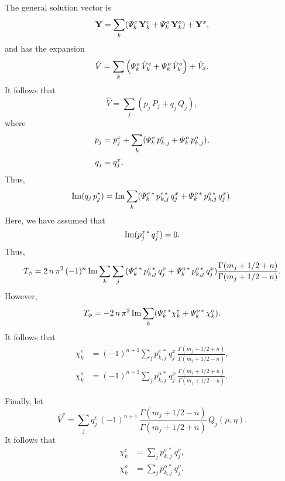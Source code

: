 \documentclass[12pt,prb,aps,notitlepage]{revtex4-1}
\begin{document}
The
general solution vector
is
\begin{equation}
{\bf Y} = \sum_k ({\mit\Psi}_k^e\,{\bf Y}_k^e + {\mit\Psi}_k^o\,{\bf Y}_k^o) + {\bf Y}^x,
\end{equation}
and has the expansion
\begin{equation}
\hat{V} = \sum_k\left({\mit\Psi}_k^e\,\hat{V}_k^e + {\mit\Psi}_k^o\,\hat{V}_k^o\right) + \hat{V}_x.
\end{equation}
It follows that
\begin{equation}
\hat{V} = \sum_j (p_j\,P_j+q_j\,Q_j),
\end{equation}
where 
\begin{align}
p_j &= p_j^x + \sum_k({\mit\Psi}_k^e\,p_{k,j}^e+ {\mit\Psi}_k^o\,p_{k,j}^o),\\[0.5ex]
q_j&= q_j^x.
\end{align}
Thus, 
\begin{equation}
{\rm Im}(q_j\,p_j^\ast)={\rm Im}\sum_k({\mit\Psi}_k^{e\,\ast}\,p_{k,j}^{e\,\ast}\,q_j^x + {\mit\Psi}_k^{o\,\ast}\,p_{k,j}^{o\,\ast}\,q_j^x).
\end{equation}
Here, we have assumed that
\begin{equation}
{\rm Im}(p_j^{x\,\ast}\,q_j^x)=0.
\end{equation}
Thus, 
\begin{equation}
T_\phi = 2\,n\,\pi^2\,(-1)^n\,{\rm Im}\sum_k\sum_j\,({\mit\Psi}_k^{e\,\ast}\,p_{k,j}^{e\,\ast}\,q_j^x + {\mit\Psi}_k^{o\,\ast}\,p_{k,j}^{o\,\ast}\,q_j^x)\frac{\Gamma(m_j+1/2+n)}{\Gamma(m_j+1/2-n)}.
\end{equation}
However,
\begin{equation}
T_\phi = - 2\,n\,\pi^2\,{\rm Im}\sum_k({\mit\Psi}_k^{e\,\ast}\chi_k^e + {\mit\Psi}_k^{o\,\ast}\,\chi_k^o).
\end{equation}
It follows that
\begin{align}
\chi_k^e &= (-1)^{n+1}\sum_j p_{k,j}^{e\,\ast}\,q_j^x\,\frac{\Gamma(m_j+1/2+n)}{\Gamma(m_j+1/2-n)},\\[0.5ex]
\chi_k^o &= (-1)^{n+1}\sum_j p_{k,j}^{o\,\ast}\,q_j^x\,\frac{\Gamma(m_j+1/2+n)}{\Gamma(m_j+1/2-n)}.
\end{align}

Finally, let
\begin{equation}
\hat{V}^v = \sum_j q_j^v\, (-1)^{n+1}\,\frac{\Gamma(m_j+1/2-n)}{\Gamma(m_j+1/2+n)}\,Q_j(\mu,\eta).
\end{equation}
It follows that
\begin{align}
\chi_k^e &= \sum_j p_{k,j}^{e\,\ast}\,q_j^v,\\[0.5ex]
\chi_k^o &= \sum_j p_{k,j}^{o\,\ast}\,q_j^v.
\end{align}
\end{document}
